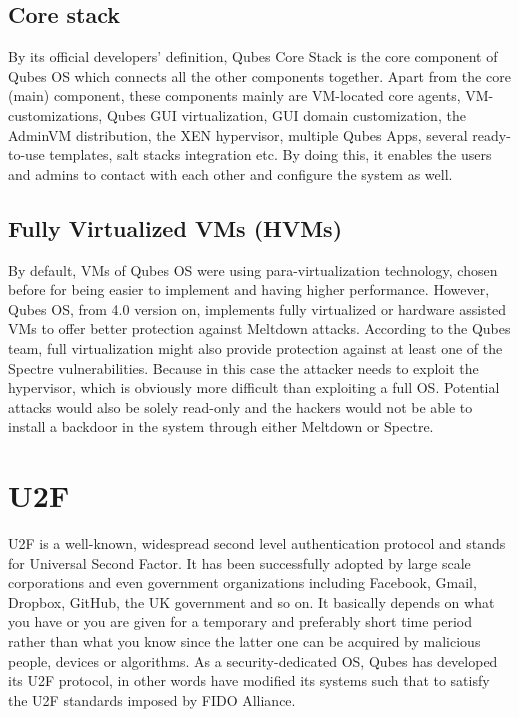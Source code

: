 \documentclass[runningheads,a4paper]{article}
\begin{document}
\subsection{Core stack} 

By its official developers' definition, Qubes
Core Stack is the core component of Qubes OS which connects all the
other components together. Apart from the core (main) component, these
components mainly are VM-located core agents, VM-customizations, Qubes
GUI virtualization, GUI domain customization, the AdminVM
distribution, the XEN hypervisor, multiple Qubes Apps, several
ready-to-use templates, salt stacks integration etc.  By doing this,
it enables the users and admins to contact with each other and
configure the system as well.

\subsection{Fully Virtualized VMs (HVMs)} 

By default, VMs of Qubes OS
were using para-virtualization technology, chosen before for being
easier to implement and having higher performance. However, Qubes OS,
from 4.0 version on, implements fully virtualized or hardware assisted
VMs to offer better protection against Meltdown attacks. According to
the Qubes team, full virtualization might also provide protection
against at least one of the Spectre vulnerabilities. Because in this
case the attacker needs to exploit the hypervisor, which is obviously
more difficult than exploiting a full OS. Potential attacks would also
be solely read-only and the hackers would not be able to install a
backdoor in the system through either Meltdown or Spectre.

\section{U2F} 

U2F is a well-known, widespread second level
authentication protocol and stands for Universal Second Factor. It has
been successfully adopted by large scale corporations and even
government organizations including Facebook, Gmail, Dropbox, GitHub,
the UK government and so on. It basically depends on what you have or
you are given for a temporary and preferably short time period rather
than what you know since the latter one can be acquired by malicious
people, devices or algorithms. As a security-dedicated OS, Qubes has
developed its U2F protocol, in other words have modified its systems
such that to satisfy the U2F standards imposed by FIDO Alliance.
\end{document}
